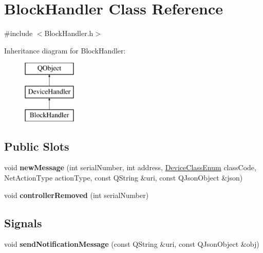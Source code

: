 \hypertarget{class_block_handler}{}\section{Block\+Handler Class Reference}
\label{class_block_handler}


{\ttfamily \#include $<$Block\+Handler.\+h$>$}

Inheritance diagram for Block\+Handler\+:\begin{figure}[H]
\begin{center}
\leavevmode
\includegraphics[height=3.000000cm]{class_block_handler}
\end{center}
\end{figure}
\subsection*{Public Slots}
\begin{DoxyCompactItemize}
\item 
\mbox{\label{class_block_handler_a13cfb11452a98a9d06f502388025ffb1}} 
void {\bfseries new\+Message} (int serial\+Number, int address, \hyperlink{_global_defs_8h_ad17679fac69973be9b3a2787a60d7722}{Device\+Class\+Enum} class\+Code, Net\+Action\+Type action\+Type, const Q\+String \&uri, const Q\+Json\+Object \&json)
\item 
\mbox{\label{class_block_handler_a2d7c23860fd5a31ce9711cb2be3f792a}} 
void {\bfseries controller\+Removed} (int serial\+Number)
\end{DoxyCompactItemize}
\subsection*{Signals}
\begin{DoxyCompactItemize}
\item 
\mbox{\label{class_block_handler_abb88946953c7b564d3dde678cf318eaa}} 
void {\bfseries send\+Notification\+Message} (const Q\+String \&uri, const Q\+Json\+Object \&obj)
\end{DoxyCompactItemize}
